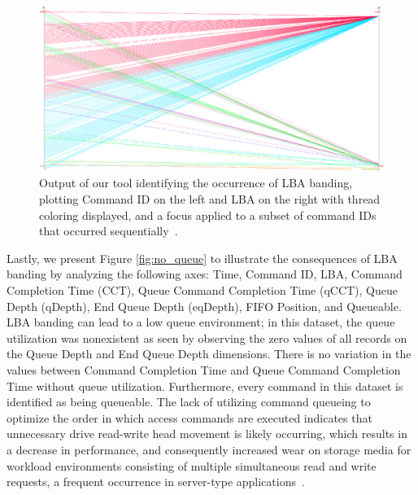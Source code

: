 \documentclass[journal]{vgtc}                %
\begin{document}
\begin{figure}[h!!]
 \centering
 \includegraphics[width=\columnwidth]{images/11.eps}
 \caption[Output of our tool identifying the occurrence of LBA banding.]{Output of our tool identifying the occurrence of LBA banding, plotting Command ID on the left and LBA on the right with thread coloring displayed, and a focus applied to a subset of command IDs that occurred sequentially~\cite{internal:collab}.}
 \label{fig:lba_banding}
\end{figure}

Lastly, we present Figure \ref{fig:no_queue} to illustrate the consequences of LBA banding by analyzing the following axes: Time, Command ID, LBA, Command Completion Time (CCT), Queue Command Completion Time (qCCT), Queue Depth (qDepth), End Queue Depth (eqDepth), FIFO Position, and Queueable. LBA banding can lead to a low queue environment; in this dataset, the queue utilization was nonexistent as seen by observing the zero values of all records on the Queue Depth and End Queue Depth dimensions. There is no variation in the values between Command Completion Time and Queue Command Completion Time without queue utilization. Furthermore, every command in this dataset is identified as being queueable. The lack of utilizing command queueing to optimize the order in which access commands are executed indicates that unnecessary drive read-write head movement is likely occurring, which results in a decrease in performance, and consequently increased wear on storage media for workload environments consisting of multiple simultaneous read and write requests, a frequent occurrence in server-type applications~\cite{ncq:whitepaper}.
\end{document}
